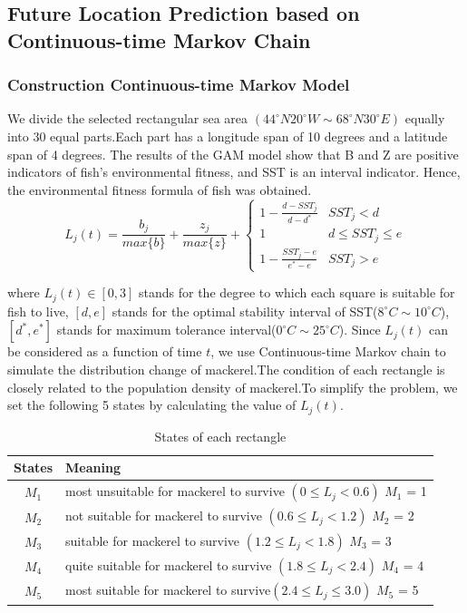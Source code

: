 \documentclass{mcmthesis}
\begin{document}
\subsection{Future Location Prediction based on Continuous-time Markov Chain}
\subsubsection{Construction Continuous-time Markov Model}
We divide the selected rectangular sea area $(44^\circ N20^\circ W\sim68^\circ N30^\circ E) $ equally into 30 equal parts.Each part has a longitude span of 10 degrees and a latitude span of 4 degrees.
The results of the GAM model show that B and Z are positive indicators of fish's environmental fitness, and  SST is an interval indicator.
Hence, the environmental fitness formula of fish was obtained.
\begin{equation}
L_j(t)=\frac{b_j}{max\{b\}}+
\frac{z_j}{max\{z\}}+
\begin{cases}
1-\frac{d-SST_j}{d-d^*}& \text{$SST_j < d$}\\
1  &\text{$d\leq SST_j\leq e$}\\
1-\frac{SST_j-e}{e^*-e}  &\text{$SST_j > e$}
\end{cases}
\end{equation}

where $L_j(t)\in [0,3]$ stands for the degree to which each square is suitable for fish to live, $[d,e]$ stands for the optimal stability interval of SST($8^\circ C\sim10^\circ C$),$[d^*,e^*]$ stands for maximum tolerance interval($0^\circ C\sim25^\circ C$).\cite{1}
Since $L_j(t)$ can be considered as a function of time $t$, we use Continuous-time Markov chain to simulate the distribution change of mackerel.The condition of each rectangle is closely related to the population density of mackerel.To simplify the problem, we set the following 5 states by calculating the value of $L_j(t)$.

\begin{table}[htbp]
\centering
\caption{States of each rectangle}
\begin{tabular}{cp{}}
\toprule
 States & Meaning\\
\midrule
$M_{1}$ & most unsuitable for mackerel to survive \textbf{$(0\leqslant L_j<0.6)$}
$M_{1}$ = 1\\ \hline
$M_{2}$ & not suitable for mackerel to survive $(0.6\leqslant L_j<1.2)$
$M_{2}$ = 2\\ \hline
$M_{3}$&  suitable for mackerel to survive $(1.2\leqslant L_j<1.8)$
$M_{3}$ = 3\\ \hline
$M_{4}$& quite suitable for mackerel to survive $(1.8\leqslant L_j<2.4)$
$M_{4}$ = 4\\ \hline
$M_{5}$& most suitable for mackerel to survive$(2.4\leqslant L_j\leqslant 3.0)$
$M_{5}$ = 5\\
\bottomrule
\end{tabular}
\end{table}
\end{document}
